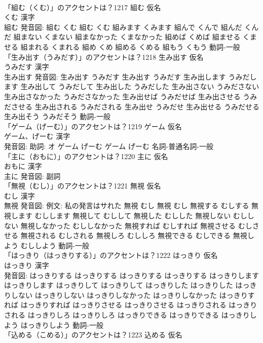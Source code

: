 \documentclass[8pt]{extreport}
\begin{document}
\begin{CJK}{UTF8}{min}
\\	「組む（くむ）」のアクセントは？1217	組む 仮名　
\\	くむ 漢字　
\\	組む 発音図:	組む くむ		組む くむ 組みます くみます 組んで くんで 組んだ くんだ 組まない くまない 組まなかった くまなかった 組めば くめば 組ませる くませる 組まれる くまれる 組め くめ 組める くめる 組もう くもう				動詞-一般 
\\	「生み出す（うみだす）」のアクセントは？1218	生み出す 仮名　
\\	うみだす 漢字　
\\	生み出す 発音図:	生み出す うみだす		生み出す うみだす 生み出します うみだします 生み出して うみだして 生み出した うみだした 生み出さない うみださない 生み出さなかった うみださなかった 生み出せば うみだせば 生み出させる うみださせる 生み出される うみだされる 生み出せ うみだせ 生み出せる うみだせる 生み出そう うみだそう				動詞-一般 
\\	「ゲーム（げーむ）」のアクセントは？1219	ゲーム 仮名　
\\	ゲーム、げーむ 漢字　
\\	発音図: 助詞: オ	ゲーム げーむ		ゲーム げーむ				名詞-普通名詞-一般 
\\	「主に（おもに）」のアクセントは？1220	主に 仮名　
\\	おもに 漢字　
\\	主に 発音図:							副詞 
\\	「無視（むし）」のアクセントは？1221	無視 仮名　
\\	むし 漢字　
\\	無視 発音図: 例文: 私の発言はサれた	無視 むし		無視 むし 無視する むしする 無視します むしします 無視して むしして 無視した むしした 無視しない むししない 無視しなかった むししなかった 無視すれば むしすれば 無視させる むしさせる 無視される むしされる 無視しろ むししろ 無視できる むしできる 無視しよう むししよう				動詞-一般 
\\	「はっきり（はっきりする）」のアクセントは？1222	はっきり 仮名　
\\	はっきり 漢字　
\\	発音図:	はっきりする はっきりする		はっきりする はっきりする はっきりします はっきりします はっきりして はっきりして はっきりした はっきりした はっきりしない はっきりしない はっきりしなかった はっきりしなかった はっきりすれば はっきりすれば はっきりさせる はっきりさせる はっきりされる はっきりされる はっきりしろ はっきりしろ はっきりできる はっきりできる はっきりしよう はっきりしよう				動詞-一般 
\\	「込める（こめる）」のアクセントは？1223	込める 仮名　

\end{CJK}
\end{document}
